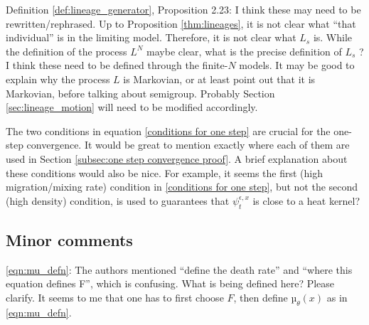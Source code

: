 \reply{
}

\begin{point}{\revref}
Definition \ref{def:lineage_generator}, Proposition 2.23: I think these may need to be rewritten/rephrased. Up
to Proposition \ref{thm:lineages}, it is not clear what ``that individual'' is in the limiting model. Therefore,
it is not clear what $L_s$ is. While the definition of the process $L^N$ maybe clear, what is the
precise definition of $L_s$ ? I think these need to be defined through the finite-$N$ models. It may
be good to explain why the process $L$ is Markovian, or at least point out that it is Markovian,
before talking about semigroup. Probably Section \ref{sec:lineage_motion} will need to be modified accordingly.
\end{point}


\begin{point}{\revref}
The two conditions in equation \eqref{conditions for one step} are crucial for the one-step convergence.
It would be great to mention exactly where each of them are used in Section \ref{subsec:one step convergence proof}.
A brief explanation about these conditions would also be nice. For example, it seems the first (high
migration/mixing rate) condition in \eqref{conditions for one step},
but not the second (high density) condition, is used
to guarantees that $\psi_t^{\epsilon,x}$ is close to a heat kernel?
\end{point}


\subsection*{Minor comments}

\begin{point}{\revref}
\eqref{eqn:mu_defn}: The authors mentioned ``define the death rate'' and ``where this equation defines F'',
which is confusing. What is being defined here? Please clarify. It seems to me that one has
to first choose $F$, then define $µ_\theta(x)$ as in \eqref{eqn:mu_defn}.
\end{point}

\reply{
}

